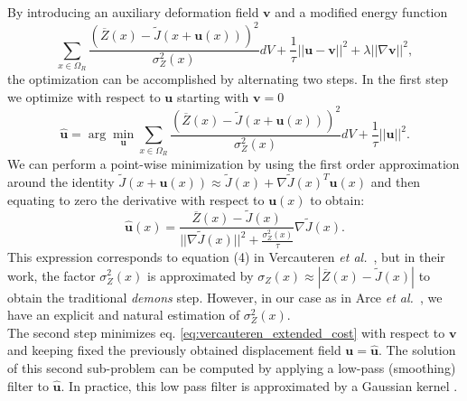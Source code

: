 By introducing an auxiliary deformation field $\mathbf{v}$ and a modified energy function
\begin{equation}\label{eq:vercauteren_extended_cost}
    \sum_{x \in \Omega_{R}} \frac{(\overline{Z}(x) - \tilde{J}(x + \mathbf{u}(x)))^{2}}{\sigma^{2}_{Z}(x)} dV + \frac{1}{\tau}||\mathbf{u}-\mathbf{v}||^{2}+\lambda ||\nabla \mathbf{v}||^{2},
\end{equation}
the optimization can be accomplished by alternating two steps. In the first step we optimize with respect to $\mathbf{u}$ starting with $\mathbf{v} = 0$
\begin{equation}\label{eq:vercauteren_step1}
    \widehat{\mathbf{u}} = \arg\min_{\mathbf{u}}\sum_{x \in \Omega_{R}} \frac{(\overline{Z}(x) - \tilde{J}(x+\mathbf{u}(x)))^{2}}{\sigma^{2}_{Z}(x)} dV + \frac{1}{\tau} ||\mathbf{u}||^{2}.
\end{equation}
We can perform a point-wise minimization by using the first order approximation around the identity
$\tilde{J}(x+\mathbf{u}(x)) \approx \tilde{J}(x) + \nabla \tilde{J}(x)^{T}\mathbf{u}(x)$ and then equating to zero the derivative with respect to $\mathbf{u}(x)$ to obtain:
\begin{equation}\label{eq:euler_lagrange_step1}
    \widehat{\mathbf{u}}(x) = \frac{\overline{Z}(x) - \tilde{J}(x)}{||\nabla \tilde{J}(x)||^{2} + \frac{\sigma_{Z}^{2}(x)}{\tau}}\nabla \tilde{J}(x).
\end{equation}
This expression corresponds to equation (4) in Vercauteren {\it et al.}~\cite{Vercauteren2009}, but in their work, the factor $\sigma_{Z}^{2}(x)$
is approximated by $\sigma_{Z}(x) \approx |\overline{Z}(x) - \tilde{J}(x)|$ to obtain the traditional {\it demons} step. However, in our case as in Arce
{\it et al.}~\cite{Arce-santana2014}, we have an explicit and natural estimation of $\sigma^{2}_{Z}(x)$.\\

The second step minimizes eq. \eqref{eq:vercauteren_extended_cost} with respect to $\mathbf{v}$ and keeping fixed the previously obtained displacement field $\mathbf{u}=\widehat{\mathbf{u}}$. The solution of this second sub-problem can be computed by applying a low-pass (smoothing) filter to $\widehat{\mathbf{u}}$. In practice,
this low pass filter is approximated by a Gaussian kernel \cite{Vercauteren2009}\cite{Avants2011}.


